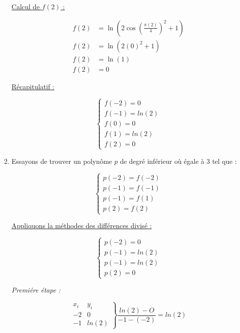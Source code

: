 \documentclass[12pt, letterpaper]{article}
\begin{document}
\begin{enumerate}
  \underline{Calcul de $f(2)$ :}
  
  \begin{equation*}
    \begin{split}
      f(2) & = \ln(2\cos \left( \frac{\pi(2)}{4} \right)^2 + 1) \\
      f(2) & = \ln(2(0)^2 + 1) \\
      f(2) & = \ln(1) \\
      f(2) & = 0
    \end{split}
  \end{equation*}

  \underline{Récapitulatif :}

  $$
  \left\{
  \begin{array}{l}
    f(-2) = 0 \\
    f(-1) = ln(2) \\
    f(0) = 0 \\
    f(1) = ln(2) \\
    f(2) = 0
  \end{array}
  \right.
  $$

\item Essayons de trouver un polynôme $p$ de degré inférieur où égale
  à 3 tel que :

  \begin{equation*}
    \left\{
    \begin{array}{l}
      p(-2) = f(-2) \\
      p(-1) = f(-1) \\
      p(-1) = f(1) \\
      p(2) = f(2) 
    \end{array}
    \right.
  \end{equation*}

  \underline{Appliquons la méthodes des différences divisé :}

  \begin{equation*}
    \left\{
    \begin{array}{l}
      p(-2) = 0 \\
      p(-1) = ln(2) \\
      p(-1) = ln(2) \\
      p(2) = 0 
    \end{array}
    \right.
  \end{equation*}

  \textit{Premiére étape :}

  \begin{equation*}
    \left.
    \begin{array}{ll}
      x_i & y_i \\
      -2 & 0 \\
      -1 & ln(2)
    \end{array}
    \right\}
    \frac{ln(2) - O}{-1 - (-2)} = ln(2)
  \end{equation*}


\end{enumerate}
\end{document}
